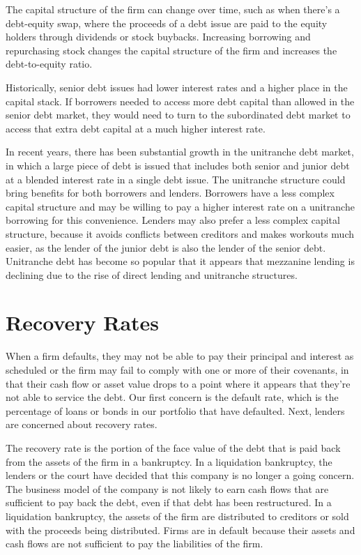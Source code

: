 \documentclass[11pt]{article}
\begin{document}
The capital structure of the firm can change over time, such as when there's a debt-equity swap, where the proceeds of a debt issue are paid to the equity holders through dividends or stock buybacks. Increasing borrowing and repurchasing stock changes the capital structure of the firm and increases the debt-to-equity ratio.

Historically, senior debt issues had lower interest rates and a higher place in the capital stack. If borrowers needed to access more debt capital than allowed in the senior debt market, they would need to turn to the subordinated debt market to access that extra debt capital at a much higher interest rate.

In recent years, there has been substantial growth in the unitranche debt market, in which a large piece of debt is issued that includes both senior and junior debt at a blended interest rate in a single debt issue. The unitranche structure could bring benefits for both borrowers and lenders. Borrowers have a less complex capital structure and may be willing to pay a higher interest rate on a unitranche borrowing for this convenience. Lenders may also prefer a less complex capital structure, because it avoids conflicts between creditors and makes workouts much easier, as the lender of the junior debt is also the lender of the senior debt. Unitranche debt has become so popular that it appears that mezzanine lending is declining due to the rise of direct lending and unitranche structures.

\section*{Recovery Rates}
When a firm defaults, they may not be able to pay their principal and interest as scheduled or the firm may fail to comply with one or more of their covenants, in that their cash flow or asset value drops to a point where it appears that they're not able to service the debt. Our first concern is the default rate, which is the percentage of loans or bonds in our portfolio that have defaulted. Next, lenders are concerned about recovery rates.

The recovery rate is the portion of the face value of the debt that is paid back from the assets of the firm in a bankruptcy. In a liquidation bankruptcy, the lenders or the court have decided that this company is no longer a going concern. The business model of the company is not likely to earn cash flows that are sufficient to pay back the debt, even if that debt has been restructured. In a liquidation bankruptcy, the assets of the firm are distributed to creditors or sold with the proceeds being distributed. Firms are in default because their assets and cash flows are not sufficient to pay the liabilities of the firm.
\end{document}
